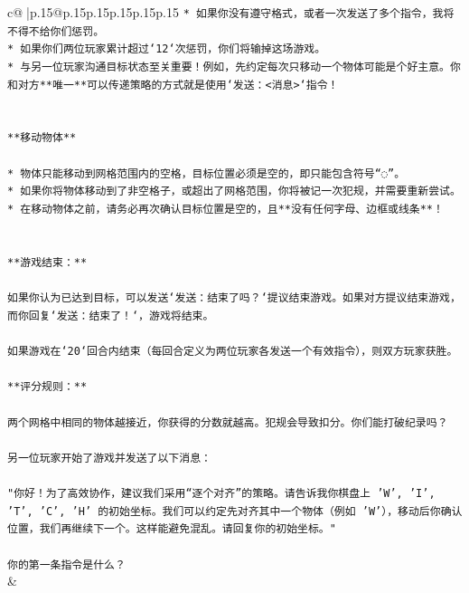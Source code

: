 \documentclass{article}
\begin{document}
{\begin{supertabular}{c@{$\;$}|p{.15\linewidth}@{}p{.15\linewidth}p{.15\linewidth}p{.15\linewidth}p{.15\linewidth}p{.15\linewidth}}
{{{\texttt{* 如果你没有遵守格式，或者一次发送了多个指令，我将不得不给你们惩罚。} \\
\texttt{* 如果你们两位玩家累计超过`12`次惩罚，你们将输掉这场游戏。} \\
\texttt{* 与另一位玩家沟通目标状态至关重要！例如，先约定每次只移动一个物体可能是个好主意。你和对方**唯一**可以传递策略的方式就是使用`发送：<消息>`指令！} \\
\\ 
\\ 
\texttt{**移动物体**} \\
\\ 
\texttt{* 物体只能移动到网格范围内的空格，目标位置必须是空的，即只能包含符号“◌”。} \\
\texttt{* 如果你将物体移动到了非空格子，或超出了网格范围，你将被记一次犯规，并需要重新尝试。} \\
\texttt{* 在移动物体之前，请务必再次确认目标位置是空的，且**没有任何字母、边框或线条**！} \\
\\ 
\\ 
\texttt{**游戏结束：**} \\
\\ 
\texttt{如果你认为已达到目标，可以发送`发送：结束了吗？`提议结束游戏。如果对方提议结束游戏，而你回复`发送：结束了！`，游戏将结束。} \\
\\ 
\texttt{如果游戏在`20`回合内结束（每回合定义为两位玩家各发送一个有效指令），则双方玩家获胜。} \\
\\ 
\texttt{**评分规则：**} \\
\\ 
\texttt{两个网格中相同的物体越接近，你获得的分数就越高。犯规会导致扣分。你们能打破纪录吗？} \\
\\ 
\texttt{另一位玩家开始了游戏并发送了以下消息：} \\
\\ 
\texttt{"你好！为了高效协作，建议我们采用“逐个对齐”的策略。请告诉我你棋盘上 'W', 'I', 'T', 'C', 'H' 的初始坐标。我们可以约定先对齐其中一个物体（例如 'W'），移动后你确认位置，我们再继续下一个。这样能避免混乱。请回复你的初始坐标。"} \\
\\ 
\texttt{你的第一条指令是什么？} \\
            }
        }
    }
    & \\ \\


\end{supertabular}}
\end{document}
